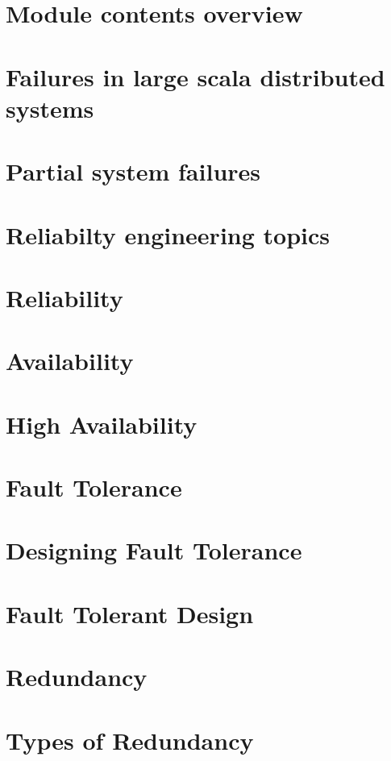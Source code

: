 \documentclass[11pt]{article}
\begin{document}
\section{Module contents overview}

\section{Failures in large scala distributed systems}

\section{Partial system failures}

\section{Reliabilty engineering topics}

\section{Reliability}

\section{Availability}

\section{High Availability}

\section{Fault Tolerance}

\section{Designing Fault Tolerance}

\section{Fault Tolerant Design}

\section{Redundancy}

\section{Types of Redundancy}
\end{document}
